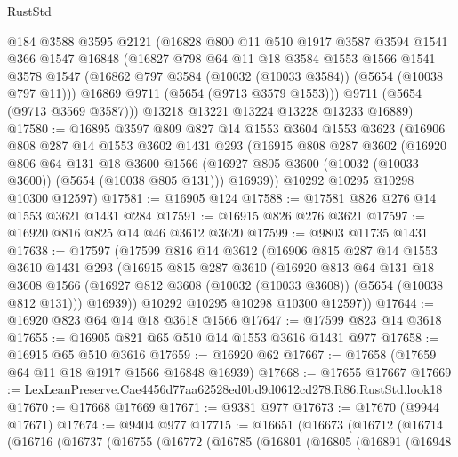 \begin{lexlean}{RustStd}
\begin{coremodule}
      @184
      @3588
      @3595
      @2121
      (@16828
        @800
        @11
        @510
        @1917
        @3587
        @3594
        @1541
        @366
        @1547
        @16848
        (@16827
          @798
          @64
          @11
          @18
          @3584
          @1553
          @1566
          @1541
          @3578
          @1547
          (@16862 @797 @3584 (@10032 (@10033 @3584)) (@5654 (@10038 @797 @11)))
          @16869
          @9711
          (@5654 (@9713 @3579 @1553)))
        @9711
        (@5654 (@9713 @3569 @3587)))
      @13218
      @13221
      @13224
      @13228
      @13233
      @16889)
@17580 := @16895
    @3597
    @809
    @827
    @14
    @1553
    @3604
    @1553
    @3623
    (@16906
      @808
      @287
      @14
      @1553
      @3602
      @1431
      @293
      (@16915
        @808
        @287
        @3602
        (@16920
          @806
          @64
          @131
          @18
          @3600
          @1566
          (@16927 @805 @3600 (@10032 (@10033 @3600)) (@5654 (@10038 @805 @131)))
          @16939))
      @10292
      @10295
      @10298
      @10300
      @12597)
@17581 := @16905 @124
@17588 := @17581 @826 @276 @14 @1553 @3621 @1431 @284
@17591 := @16915 @826 @276 @3621
@17597 := @16920 @816 @825 @14 @46 @3612 @3620
@17599 := @9803 @11735 @1431
@17638 := @17597
    (@17599
      @816
      @14
      @3612
      (@16906
        @815
        @287
        @14
        @1553
        @3610
        @1431
        @293
        (@16915
          @815
          @287
          @3610
          (@16920
            @813
            @64
            @131
            @18
            @3608
            @1566
            (@16927 @812 @3608 (@10032 (@10033 @3608)) (@5654 (@10038 @812 @131)))
            @16939))
        @10292
        @10295
        @10298
        @10300
        @12597))
@17644 := @16920 @823 @64 @14 @18 @3618 @1566
@17647 := @17599 @823 @14 @3618
@17655 := @16905 @821 @65 @510 @14 @1553 @3616 @1431 @977
@17658 := @16915 @65 @510 @3616
@17659 := @16920 @62
@17667 := @17658 (@17659 @64 @11 @18 @1917 @1566 @16848 @16939)
@17668 := @17655 @17667
@17669 := LexLeanPreserve.Cae4456d77aa62528ed0bd9d0612cd278.R86.RustStd.look18
@17670 := @17668 @17669
@17671 := @9381 @977
@17673 := @17670 (@9944 @17671)
@17674 := @9404 @977
@17715 := @16651
    (@16673
      (@16712
        (@16714
          (@16716
            (@16737
              (@16755
                (@16772
                  (@16785
                    (@16801
                      (@16805
                        (@16891
                          (@16948

\end{coremodule}
\end{lexlean}
